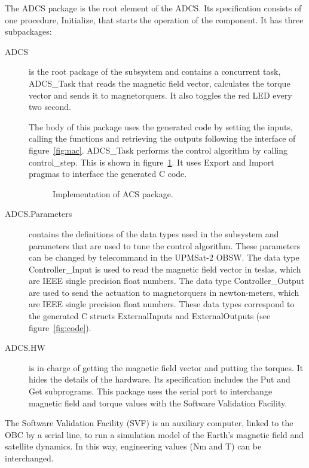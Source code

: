 The ADCS package is the root element of the ADCS. Its specification consists of one procedure, Initialize, that starts the operation of the component. It has three subpackages:
\begin{description}
\item[ADCS] is the root package of the subsystem and contains a concurrent task, ADCS\_Task that reads the magnetic field vector, calculates the torque vector and sends it to magnetorquers. It also toggles the red LED every two second.

The body of this package uses the generated code by setting the inputs, calling the functions and retrieving the outputs following the interface of figure~\ref{fig:nac}. ADCS\_Task performs the control algorithm by calling control\_step. This is shown in figure~\ref{fig:acs-body}.
It uses Export and Import pragmas to interface the generated C code.

\begin{figure}[h]
            \caption{Implementation of ACS package.}
            \label{fig:acs-body}
\end{figure}

\item[ADCS.Parameters] contains the definitions of the data types used in the subsystem and parameters that are used to tune the control algorithm. These parameters can be changed by telecommand in the UPMSat-2 OBSW. The data type Controller\_Input is used to read the magnetic field vector in teslas, which are IEEE single precision float numbers. The data type Controller\_Output are used to send the actuation to magnetorquers in newton-meters, which are IEEE single precision float numbers. These data types correspond to the generated C structs ExternalInputs and ExternalOutputs (see figure~\ref{fig:code}).

\item[ADCS.HW] is in charge of getting the magnetic field vector and putting the
torques. It hides the details of the hardware. Its specification includes the Put and Get subprograms. This package uses the serial port to interchange magnetic field and torque values with the Software Validation Facility.
\end{description}

The Software Validation Facility (SVF) is an auxiliary computer, linked to the OBC by a serial line, to run a simulation model of the Earth's magnetic field and satellite dynamics. In this way, engineering values (Nm and T) can be interchanged.

